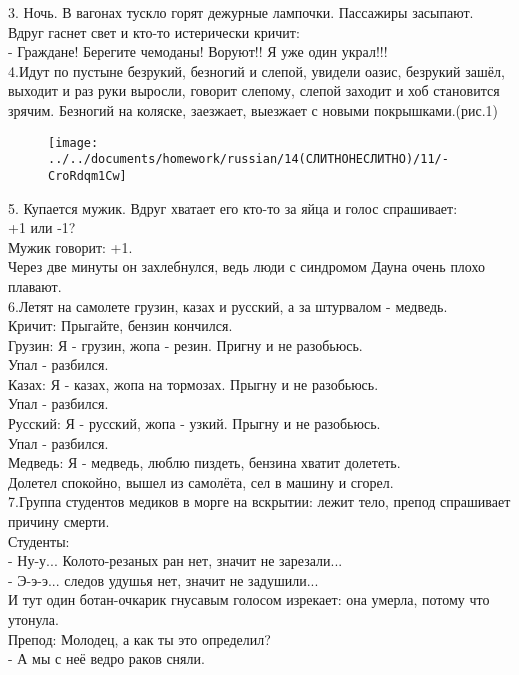 \documentclass[a4paper,20pt,notitlepage]{extbook}
\begin{document}
	3. Ночь. В вагонах тускло горят дежурные лампочки. Пассажиры засыпают.\\
	Вдруг гаснет свет и кто-то истерически кричит:\\
	- Граждане! Берегите чемоданы! Воруют!! Я уже один украл!!!\\
	
	4.Идут по пустыне безрукий, безногий и слепой, увидели оазис, безрукий зашёл, выходит и раз руки выросли, говорит слепому, слепой заходит и хоб становится зрячим. Безногий на коляске, заезжает, выезжает с новыми покрышками.(рис.1)\\
	
\begin{figure}[H]
	\centering
	\texttt{[image: ../../documents/homework/russian/14(СЛИТНОНЕСЛИТНО)/11/-CroRdqm1Cw]}
	\caption{}
	\label{fig:-crordqm1cw}
\end{figure}

	5. Купается мужик. Вдруг хватает его кто-то за яйца и голос спрашивает:\\
	\textemdash+1 или -1?\\
	Мужик говорит: +1.\\
	Через две минуты он захлебнулся, ведь люди с синдромом Дауна очень плохо плавают.\\
		6.Летят на самолете грузин, казах и русский, а за штурвалом - медведь.\\
	Кричит: Прыгайте, бензин кончился.\\
	Грузин: Я - грузин, жопа - резин. Пригну и не разобьюсь.\\
	Упал - разбился.\\
	Казах: Я - казах, жопа на тормозах. Прыгну и не разобьюсь.\\
	Упал - разбился.\\
	Русский: Я - русский, жопа - узкий. Прыгну и не разобьюсь.\\
	Упал - разбился.\\
	Медведь: Я - медведь, люблю пиздеть, бензина хватит долететь.\\
	Долетел спокойно, вышел из самолёта, сел в машину и сгорел.\\
	
	7.Группа студентов медиков в морге на вскрытии: лежит тело, препод спрашивает причину смерти.\\
	Студенты:\\
	- Ну-у... Колото-резаных ран нет, значит не зарезали...\\
	- Э-э-э... следов удушья нет, значит не задушили...\\
	И тут один ботан-очкарик гнусавым голосом изрекает: она умерла, потому что утонула.\\
	Препод: Молодец, а как ты это определил?\\
	- А мы с неё ведро раков сняли.\\
	
\end{document}
